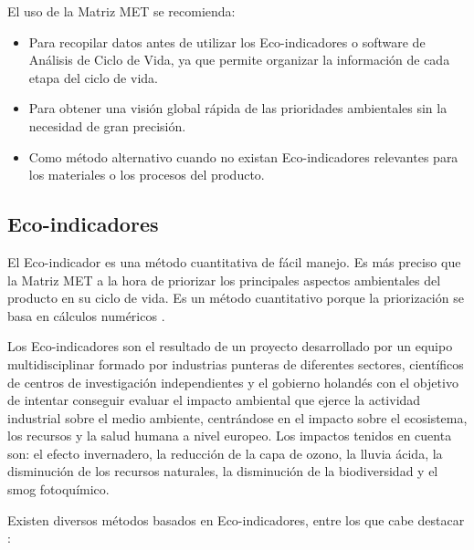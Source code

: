 El uso de la Matriz MET se recomienda:
\begin{itemize}
  \item Para recopilar datos antes de utilizar los Eco-indicadores o software de Análisis de Ciclo de Vida, ya que permite organizar la información de cada etapa del ciclo de vida.
  \item Para obtener una visión global rápida de las prioridades ambientales sin la necesidad de gran precisión.
  \item Como método alternativo cuando no existan Eco-indicadores relevantes para los materiales o los procesos del producto.
\end{itemize}

\subsection{Eco-indicadores}

El Eco-indicador es una método cuantitativa de fácil manejo. Es más preciso que la Matriz MET a la hora de priorizar los principales aspectos ambientales del producto en su ciclo de vida. Es un método cuantitativo porque la priorización se basa en cálculos numéricos \cite{ihobeeco}.

Los Eco-indicadores son el resultado de un proyecto desarrollado por un equipo multidisciplinar formado por industrias punteras de diferentes sectores, científicos de centros de investigación independientes y el gobierno holandés con el objetivo de intentar conseguir evaluar el impacto ambiental que ejerce la actividad industrial sobre el medio ambiente, centrándose en el impacto sobre el ecosistema, los recursos y la salud humana a nivel europeo. Los impactos tenidos en cuenta son: el efecto invernadero, la reducción de la capa de ozono, la lluvia ácida, la disminución de los recursos naturales, la disminución de la biodiversidad y el smog fotoquímico.

Existen diversos métodos basados en Eco-indicadores, entre los que cabe destacar \cite{mlgceballos}:


